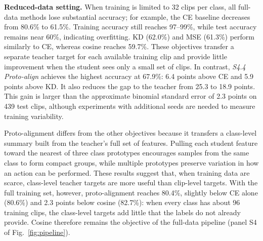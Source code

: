 \documentclass[conference]{IEEEtran}
\begin{document}
\textbf{Reduced-data setting.} When training is limited to 32 clips per class, all
full-data methods lose substantial accuracy; for example, the CE baseline decreases from
80.6\% to 61.5\%. Training accuracy still reaches 97--99\%, while test accuracy remains
near 60\%, indicating overfitting. KD (62.0\%) and MSE (61.3\%) perform similarly to CE,
whereas cosine reaches 59.7\%. These objectives transfer a separate teacher target for
each available training clip and provide little improvement when the student sees only a
small set of clips. In contrast, \emph{S4.4 Proto-align} achieves the highest accuracy at
67.9\%: 6.4 points above CE and 5.9 points above KD. It also reduces the gap to the teacher
from 25.3 to 18.9 points. This gain is larger than the approximate binomial standard error
of 2.3 points on 439 test clips, although experiments with additional seeds are needed to
measure training variability.

Proto-alignment differs from the other objectives because it transfers a class-level
summary built from the teacher's full set of features. Pulling each student feature toward
the nearest of three class prototypes encourages samples from the same class to form
compact groups, while multiple prototypes preserve variation in how an action can be
performed. These results suggest that, when training data are scarce, class-level teacher
targets are more useful than clip-level targets. With the full training set, however,
proto-alignment reaches 80.4\%, slightly below CE alone (80.6\%) and 2.3 points below cosine
(82.7\%): when every class has about 96 training clips, the class-level targets add little that
the labels do not already provide. Cosine therefore remains the objective of the full-data
pipeline (panel S4 of Fig.~\ref{fig:pipeline}).

\end{document}

